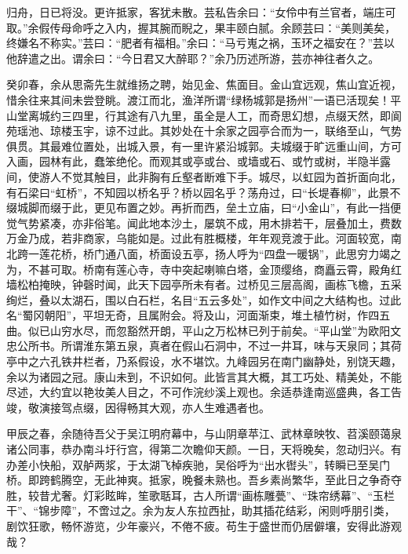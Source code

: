 \documentclass[]{article}
\begin{document}
归舟，日已将没。更许抵家，客犹未散。芸私告余曰：``女伶中有兰官者，端庄可取。''余假传母命呼之入内，握其腕而睨之，果丰颐白腻。余顾芸曰：``美则美矣，终嫌名不称实。''芸曰：``肥者有福相。''余曰：``马亏嵬之祸，玉环之福安在？''芸以他辞遣之出。谓余曰：``今日君又大醉耶？''余乃历述所游，芸亦神往者久之。

癸卯春，余从思斋先生就维扬之聘，始见金、焦面目。金山宜远观，焦山宜近视，惜余往来其间未尝登眺。渡江而北，渔洋所谓``绿杨城郭是扬州''一语已活现矣！平山堂离城约三四里，行其途有八九里，虽全是人工，而奇思幻想，点缀天然，即阆苑瑶池、琼楼玉宇，谅不过此。其妙处在十余家之园亭合而为一，联络至山，气势俱贯。其最难位置处，出城入景，有一里许紧沿城郭。夫城缀于旷远重山间，方可入画，园林有此，蠢笨绝伦。而观其或亭或台、或墙或石、或竹或树，半隐半露间，使游人不觉其触目，此非胸有丘壑者断难下手。城尽，以虹园为首折面向北，有石梁曰``虹桥''，不知园以桥名乎？桥以园名乎？荡舟过，曰``长堤春柳''，此景不缀城脚而缀于此，更见布置之妙。再折而西，垒土立庙，曰``小金山''，有此一挡便觉气势紧凑，亦非俗笔。闻此地本沙土，屡筑不成，用木排若干，层叠加土，费数万金乃成，若非商家，乌能如是。过此有胜概楼，年年观竞渡于此。河面较宽，南北跨一莲花桥，桥门通八面，桥面设五亭，扬人呼为``四盘一暖锅''，此思穷力竭之为，不甚可取。桥南有莲心寺，寺中突起喇嘛白塔，金顶缨络，商矗云霄，殿角红墙松柏掩映，钟磬时闻，此天下园亭所未有者。过桥见三层高阁，画栋飞檐，五采绚烂，叠以太湖石，围以白石栏，名目``五云多处''，如作文中间之大结构也。过此名``蜀冈朝阳''，平坦无奇，且属附会。将及山，河面渐束，堆土植竹树，作四五曲。似已山穷水尽，而忽豁然开朗，平山之万松林已列于前矣。``平山堂''为欧阳文忠公所书。所谓淮东第五泉，真者在假山石洞中，不过一井耳，味与天泉同；其荷亭中之六孔铁井栏者，乃系假设，水不堪饮。九峰园另在南门幽静处，别饶天趣，余以为诸园之冠。康山未到，不识如何。此皆言其大概，其工巧处、精美处，不能尽述，大约宜以艳妆美人目之，不可作浣纱溪上观也。余适恭逢南巡盛典，各工告竣，敬演接驾点缀，因得畅其大观，亦人生难遇者也。

甲辰之春，余随待吾父于吴江明府幕中，与山阴章苹江、武林章映牧、苕溪颐蔼泉诸公同事，恭办南斗圩行宫，得第二次瞻仰天颜。一日，天将晚矣，忽动归兴。有办差小快船，双舻两浆，于太湖飞棹疾驰，吴俗呼为``出水辔头''，转瞬已至吴门桥。即跨鹤腾空，无此神爽。抵家，晚餐未熟也。吾乡素尚繁华，至此日之争奇夺胜，较昔尤奢。灯彩眩眸，笙歌聒耳，古人所谓``画栋雕甍''、``珠帘绣幕''、``玉栏干''、``锦步障''，不啻过之。余为友人东拉西扯，助其插花结彩，闲则呼朋引类，剧饮狂歌，畅怀游览，少年豪兴，不倦不疲。苟生于盛世而仍居僻壤，安得此游观哉？
\end{document}
